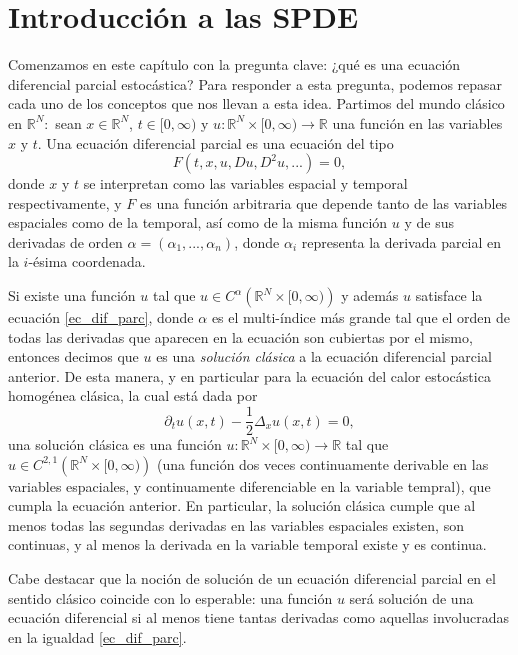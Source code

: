\documentclass[letterpaper,twoside,12pt]{book}
\newcommand{\R}{\mathbb{R}}
\newcommand{\1}{\mathds{1}}
\renewcommand{\to}{\rightarrow}
\theoremstyle{definition}
\theoremstyle{definition}
\theoremstyle{remark}
\theoremstyle{definition}
\theoremstyle{definition}
\theoremstyle{definition}
\theoremstyle{definition}
\theoremstyle{definition}
\begin{document}
\section{Introducción a las SPDE}

Comenzamos en este capítulo con la pregunta clave: ¿qué es una ecuación diferencial parcial estocástica? Para responder a esta pregunta, podemos repasar cada uno de los conceptos que nos llevan a esta idea. Partimos del mundo clásico en $\R^{N}:$ sean $x\in \R^{N}$, $t\in [0,\infty)$ y $u:\R^{N}\times[0,\infty)\to \R$ una función en las variables $x$ y $t$. Una ecuación diferencial parcial es una ecuación del tipo 
\begin{equation}\label{ec_dif_parc}
    F(t,x,u,Du,D^2u,...)=0,    
\end{equation}
donde $x$ y $t$ se interpretan como las variables espacial y temporal respectivamente, y $F$ es una función arbitraria que depende tanto de las variables espaciales como de la temporal, así como de la misma función $u$ y de sus derivadas de orden $\alpha=(\alpha_1,...,\alpha_n)$, donde $\alpha_i$ representa la derivada parcial en la $i$-ésima coordenada.

Si existe una función $u$ tal que $u\in C^{\alpha}\left(\R^{N}\times [0,\infty)\right)$ y además $u$ satisface la ecuación \eqref{ec_dif_parc}, donde $\alpha$ es el multi-índice más grande tal que el orden de todas las derivadas que aparecen en la ecuación son cubiertas por el mismo, entonces decimos que $u$ es una \textit{solución clásica} a la ecuación diferencial parcial anterior. De esta manera, y en particular para la ecuación del calor estocástica homogénea clásica, la cual está dada por 
   \begin{equation*}
      \partial_tu(x,t)-\frac{1}{2}\Delta_x u(x,t)=0,
   \end{equation*}
una solución clásica es una función $u:\R^{N}\times[0,\infty)\to \R$ tal que $u\in C^{2,1}\left(\R^{N}\times [0,\infty)\right)$ (una función dos veces continuamente derivable en las variables espaciales, y continuamente diferenciable en la variable tempral), que cumpla la ecuación anterior. En particular, la solución clásica cumple que al menos todas las segundas derivadas en las variables espaciales existen, son continuas, y al menos la derivada en la variable temporal existe y es continua.

Cabe destacar que la noción de solución de un ecuación diferencial parcial en el sentido clásico coincide con lo esperable: una función $u$ será solución de una ecuación diferencial si al menos tiene tantas derivadas como aquellas involucradas en la igualdad \eqref{ec_dif_parc}.
\end{document}
